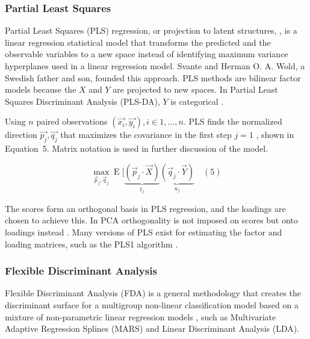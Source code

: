 \documentclass[sn-mathphys-num]{sn-jnl}%
\begin{document}
\subsubsection{Partial Least Squares}

Partial Least Squares (PLS) regression, or projection to latent structures, \cite{wold2001pls, abdi2010partial}, is a linear regression statistical model that transforms the predicted and the observable variables to a new space instead of identifying maximum variance hyperplanes used in a linear regression model. Svante and Herman O. A. Wold, a Swedish father and son, founded this approach. PLS methods are bilinear factor models because the $X$ and $Y$ are projected to new spaces. In Partial Least Squares Discriminant Analysis (PLS-DA), $Y$ is categorical \cite{saebo2008lpls}.

Using $n$ paired observations $\left(\vec{x_{i}}, \vec{y_{i}}\right), i \in 1, \dots, n$. PLS finds the normalized direction $\vec{p_{j}}, \vec{q_{j}}$ that maximizes the covariance in the first step $j = 1$ \cite{youtubeYouTube}, shown in Equation~5. Matrix notation is used in further discussion of the model.

\begin{equation}
	\max_{{\vec{p}}_{j},{\vec{q}}_{j}}\operatorname{E} [\underbrace{({\vec{p}}_{j}\cdot {\vec{X}})}_{t_{j}}\underbrace{({\vec{q}}_{j}\cdot {\vec{Y}})}_{u_{j}}
	\quad\left(5\right)
\end{equation}

The scores form an orthogonal basis in PLS regression, and the loadings are chosen to achieve this. In PCA orthogonality is not imposed on scores but onto loadings instead \cite{lindgren1993kernel, de1994comments, dayal1997improved, de1993simpls, rannar1994pls, abdi2010partial}. Many versions of PLS exist for estimating the factor and loading matrices, such as the PLS1 algorithm \cite{takane2016pls, hoskuldsson1988pls}. 

\subsubsection{Flexible Discriminant Analysis}

Flexible Discriminant Analysis (FDA) is a general methodology that creates the discriminant surface for a multigroup non-linear classification model based on a mixture of non-parametric linear regression models \cite{hastie1995penalized}, such as Multivariate Adaptive Regression Splines (MARS) and Linear Discriminant Analysis (LDA).
\end{document}

